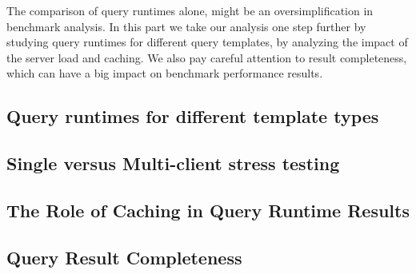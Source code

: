
The comparison of query runtimes alone, might be an oversimplification in benchmark analysis. 
In this part we take our analysis one step further by studying query runtimes for different query templates, by analyzing the impact of the server load and caching. We also pay careful attention to result completeness, which can have a big impact on benchmark performance results.


%
%

\subsection{Query runtimes for different template types}
\label{subsec:templates}


\subsection{Single versus Multi-client stress testing}
\label{subsec:load}


\subsection{The Role of Caching in Query Runtime Results}
\label{subsec:caching}


\subsection{Query Result Completeness}
\label{subsec:completeness}

